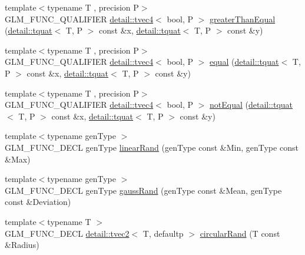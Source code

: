 \begin{DoxyCompactItemize}
\item 
{\footnotesize template$<$typename T , precision P$>$ }\\G\+L\+M\+\_\+\+F\+U\+N\+C\+\_\+\+Q\+U\+A\+L\+I\+F\+I\+ER \hyperlink{structglm_1_1detail_1_1tvec4}{detail\+::tvec4}$<$ bool, P $>$ \hyperlink{group__gtc__quaternion_gac90d5af34a03cd665a349ac30e4cc44c}{greater\+Than\+Equal} (\hyperlink{structglm_1_1detail_1_1tquat}{detail\+::tquat}$<$ T, P $>$ const \&x, \hyperlink{structglm_1_1detail_1_1tquat}{detail\+::tquat}$<$ T, P $>$ const \&y)
\item 
{\footnotesize template$<$typename T , precision P$>$ }\\G\+L\+M\+\_\+\+F\+U\+N\+C\+\_\+\+Q\+U\+A\+L\+I\+F\+I\+ER \hyperlink{structglm_1_1detail_1_1tvec4}{detail\+::tvec4}$<$ bool, P $>$ \hyperlink{group__gtc__quaternion_ga32ff2cc6fb576639a6237d8d8ed5818b}{equal} (\hyperlink{structglm_1_1detail_1_1tquat}{detail\+::tquat}$<$ T, P $>$ const \&x, \hyperlink{structglm_1_1detail_1_1tquat}{detail\+::tquat}$<$ T, P $>$ const \&y)
\item 
{\footnotesize template$<$typename T , precision P$>$ }\\G\+L\+M\+\_\+\+F\+U\+N\+C\+\_\+\+Q\+U\+A\+L\+I\+F\+I\+ER \hyperlink{structglm_1_1detail_1_1tvec4}{detail\+::tvec4}$<$ bool, P $>$ \hyperlink{group__gtc__quaternion_gaa3a8cf1aa580e435ca96acafbd7870a5}{not\+Equal} (\hyperlink{structglm_1_1detail_1_1tquat}{detail\+::tquat}$<$ T, P $>$ const \&x, \hyperlink{structglm_1_1detail_1_1tquat}{detail\+::tquat}$<$ T, P $>$ const \&y)
\item 
{\footnotesize template$<$typename gen\+Type $>$ }\\G\+L\+M\+\_\+\+F\+U\+N\+C\+\_\+\+D\+E\+CL gen\+Type \hyperlink{group__gtc__random_ga310c2e65883e62a4405128f187f41f27}{linear\+Rand} (gen\+Type const \&Min, gen\+Type const \&Max)
\item 
{\footnotesize template$<$typename gen\+Type $>$ }\\G\+L\+M\+\_\+\+F\+U\+N\+C\+\_\+\+D\+E\+CL gen\+Type \hyperlink{group__gtc__random_gacba09f5b8e1e8eac3d318ae6426bbd26}{gauss\+Rand} (gen\+Type const \&Mean, gen\+Type const \&Deviation)
\item 
{\footnotesize template$<$typename T $>$ }\\G\+L\+M\+\_\+\+F\+U\+N\+C\+\_\+\+D\+E\+CL \hyperlink{structglm_1_1detail_1_1tvec2}{detail\+::tvec2}$<$ T, defaultp $>$ \hyperlink{group__gtc__random_gac1ab03c2c797ce352fd74cdb5229b151}{circular\+Rand} (T const \&Radius)
\item 

\end{DoxyCompactItemize}
